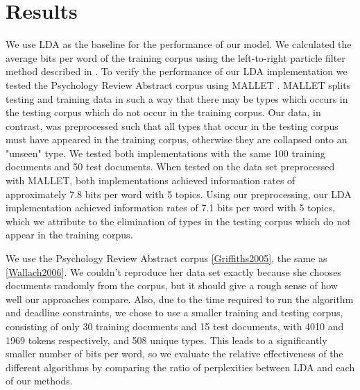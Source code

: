 \section{Results}

We use LDA as the baseline for the performance of our model.  We calculated the average bits per word of the training corpus using the left-to-right particle filter method described in \cite{Wallach08}.  To verify the performance of our LDA implementation we tested the Psychology Review Abstract corpus using MALLET \cite{mallet}.  MALLET splits testing and training data in such a way that there may be types which occurs in the testing corpus which do not occur in the training corpus.  Our data, in contrast, was preprocessed such that all types that occur in the testing corpus must have appeared in the training corpus, otherwise they are collapsed onto an "unseen" type.  We tested both implementations with the same 100 training documents and 50 test documents.  When tested on the data set preprocessed with MALLET, both implementations achieved information rates of approximately 7.8 bits per word with 5 topics.  Using our preprocessing, our LDA implementation achieved information rates of 7.1 bits per word with 5 topics, which we attribute to the elimination of types in the testing corpus which do not appear in the training corpus.

We use the Psychology Review Abstract corpus \ref{Griffiths2005}, the same as \ref{Wallach2006}.  We couldn't reproduce her data set exactly because she chooses documents randomly from the corpus, but it should give a rough sense of how well our approaches compare.  Also, due to the time required to run the algorithm and deadline constraints, we chose to use a smaller training and testing corpus, consisting of only 30 training documents and 15 test documents, with 4010 and 1969 tokens respectively, and 508 unique types.  This leads to a significantly smaller number of bits per word, so we evaluate the relative effectiveness of the different algorithms by comparing the ratio of perplexities between LDA and each of our methods.

